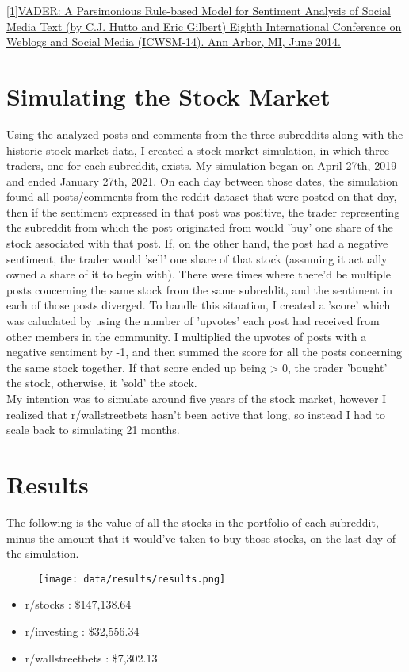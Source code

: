 \documentclass[11pt]{article}
\begin{document}
   \begin{small}
   \href{https://ojs.aaai.org/index.php/ICWSM/article/view/14550/14399}
   {[1]VADER: A Parsimonious Rule-based Model for Sentiment Analysis of Social Media Text
   (by C.J. Hutto and Eric Gilbert)
   Eighth International Conference on Weblogs and Social Media (ICWSM-14). Ann Arbor, MI, June 2014.}
   \end{small}
\section{Simulating the Stock Market}
    Using the analyzed posts and comments from the three subreddits along with
    the historic stock market data, I created a stock market simulation, in
    which three traders, one for each subreddit, exists. My simulation began on
    April 27th, 2019 and ended January 27th, 2021. On each day between those
    dates, the simulation found all posts/comments from the reddit dataset
    that were posted on that day, then if the sentiment expressed in that
    post was positive, the trader representing the subreddit from which the
    post originated from would 'buy' one share of the stock associated with
    that post. If, on the other hand, the post had a negative sentiment, the
    trader would 'sell' one share of that stock (assuming it actually owned a
    share of it to begin with). There were times where there'd be multiple
    posts concerning the same stock from the same subreddit, and the sentiment
    in each of those posts diverged. To handle this situation, I created a
    'score' which was caluclated by using the number of 'upvotes' each post
    had received from other members in the community. I multiplied the upvotes
    of posts with a negative sentiment by -1, and then summed the score for
    all the posts concerning the same stock together. If that score ended up
    being > 0, the trader 'bought' the stock, otherwise, it 'sold' the stock.\\

    My intention was to simulate around five years of the stock market, however
    I realized that r/wallstreetbets hasn't been active that long, so instead I
    had to scale back to simulating 21 months.
\section{Results}
    The following is the value of all the stocks in the portfolio of each
    subreddit, minus the amount that it would've taken to buy those stocks,
    on the last day of the simulation.\\
    \begin{figure}
	\centering
	\texttt{[image: data/results/results.png]}
    \end{figure}
    \begin{itemize}
	\item r/stocks : \$147,138.64
	\item r/investing : \$32,556.34
	\item r/wallstreetbets : \$7,302.13
    \end{itemize}
\end{document}
